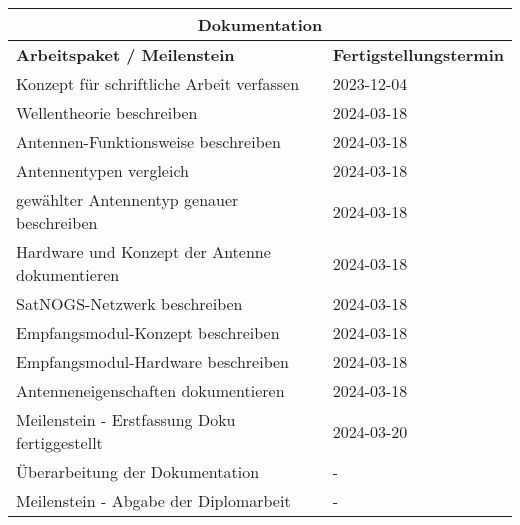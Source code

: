 \begin{table}[H]
	\begin{tabular}{|p{.6\linewidth}|p{.3\linewidth}|}
		\multicolumn{2}{c}{\textbf{Dokumentation}} \\ \hline
		\textbf{Arbeitspaket / Meilenstein} & \textbf{Fertigstellungstermin} \\ \hline
		Konzept für schriftliche Arbeit verfassen & 2023-12-04 \\ \hline
		Wellentheorie beschreiben & 2024-03-18 \\ \hline
		Antennen-Funktionsweise beschreiben & 2024-03-18 \\ \hline
		Antennentypen vergleich & 2024-03-18 \\ \hline
		gewählter Antennentyp genauer beschreiben & 2024-03-18 \\ \hline
		Hardware und Konzept der Antenne dokumentieren & 2024-03-18 \\ \hline
		SatNOGS-Netzwerk beschreiben & 2024-03-18 \\ \hline
		Empfangsmodul-Konzept beschreiben & 2024-03-18 \\ \hline
		Empfangsmodul-Hardware beschreiben & 2024-03-18 \\ \hline
		Antenneneigenschaften dokumentieren & 2024-03-18 \\ \hline
		Meilenstein - Erstfassung Doku fertiggestellt & 2024-03-20 \\ \hline
		Überarbeitung der Dokumentation & - \\ \hline
		Meilenstein - Abgabe der Diplomarbeit & - \\ \hline
	\end{tabular}
\end{table}